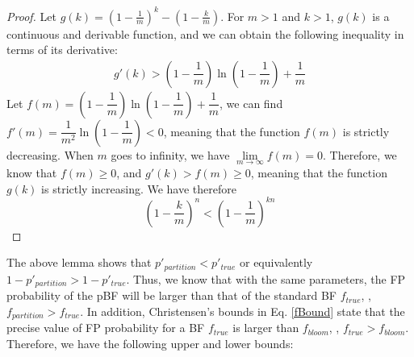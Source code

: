 \begin{proof}
Let $g(k)=( 1-\frac{1}{m} )  ^k- ( 1-\frac{k}{m} )$. For $m>1$ and $k>1$, $g(k)$ is a continuous and derivable function, and we can obtain the following inequality in terms of its derivative:
\begin{equation}
\begin{aligned}
g'(k) %
> \left( 1- \dfrac{1}{m}\right)\ln\left(1-\dfrac{1}{m}\right)+\dfrac{1}{m}
\end{aligned}
\end{equation}
Let $f(m)=\left( 1- \dfrac{1}{m}\right)\ln\left(1-\dfrac{1}{m}\right)+\dfrac{1}{m}$, we can find $f'(m) = \dfrac{1}{m^2} \ln\left(1-\dfrac{1}{m}\right)< 0$, meaning that the function $f(m)$ is strictly decreasing. When $m$ goes to infinity, we have $\lim\limits_{m \to \infty}  f(m) =  0$. Therefore, we know that $f(m) \geqslant 0$, and $g'(k) > f(m) \geqslant 0$, meaning that the function $g(k)$ is strictly increasing.
We have therefore 
\begin{equation}
\left( 1-\dfrac{k}{m} \right) ^n   <
\left( 1-\dfrac{1}{m} \right)  ^{kn}
\end{equation}
\end{proof}



The above lemma shows that $p'_{partition} < p'_{true}$ or equivalently $1-p'_{partition} > 1-p'_{true}$. Thus, we know that with the same parameters, the FP probability of the pBF will be larger than that of the standard BF $f_{true}$, \ie, $f_{partition} > f_{true}$. In addition, Christensen’s bounds in Eq. \ref{fBound} state that the precise value of FP probability for a BF $f_{true}$ is larger than $f_{bloom}$, \ie, $f_{true} > f_{bloom}$. Therefore, we have the following upper and lower bounds:

